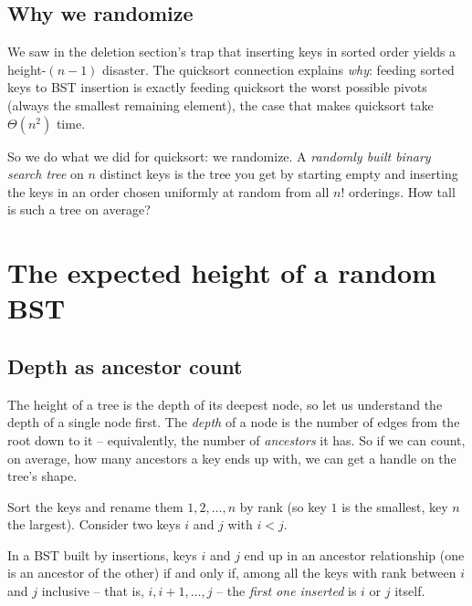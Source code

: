 \subsection{Why we randomize}

We saw in the deletion section's trap that inserting keys in sorted order yields a
height-$(n-1)$ disaster. The quicksort connection explains \emph{why}: feeding sorted keys to
BST insertion is exactly feeding quicksort the worst possible pivots (always the smallest
remaining element), the case that makes quicksort take $\Theta(n^2)$ time.

So we do what we did for quicksort: we randomize. A \emph{randomly built binary search tree}
on $n$ distinct keys is the tree you get by starting empty and inserting the keys in an order
chosen uniformly at random from all $n!$ orderings. How tall
is such a tree on average?

\section{The expected height of a random BST}
\label{ch12:sec-expected-height}

\subsection{Depth as ancestor count}

The height of a tree is the depth of its deepest node, so let us understand the depth of a
single node first. The \emph{depth} of a node is the number of edges from the root down to it
-- equivalently, the number of \emph{ancestors} it has. So if we can count, on average, how
many ancestors a key ends up with, we can get a handle on the tree's shape.

Sort the keys and rename them
$1,2,\dots,n$ by rank (so key $1$ is the smallest, key $n$ the largest). Consider two keys
$i$ and $j$ with $i < j$.

\begin{lemma}
\label{ch12:ancestor-criterion}
In a BST built by insertions, keys $i$ and $j$ end up in an ancestor relationship (one is an
ancestor of the other) if and only if, among all the keys with rank between $i$ and $j$
inclusive -- that is, $i, i{+}1, \dots, j$ -- the \emph{first one inserted} is $i$ or $j$
itself.
\end{lemma}

